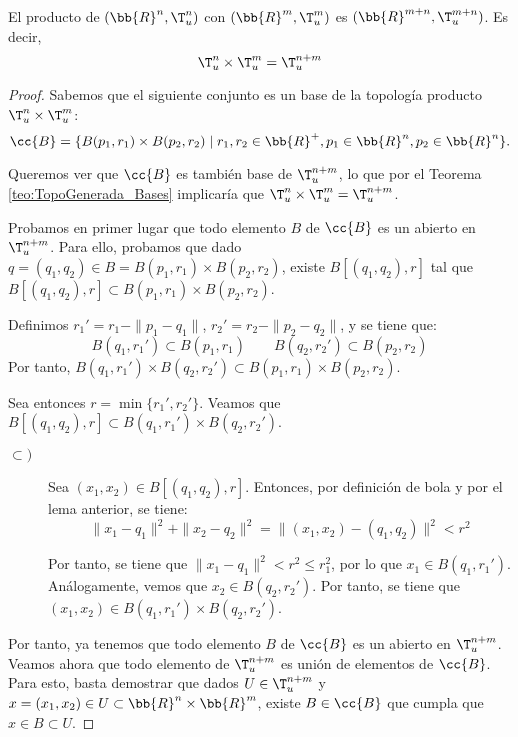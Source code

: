 \begin{prop}
    El producto de $(\bb{R}^n,\T_u^n)$ con $(\bb{R}^m,\T_u^m)$ es $(\bb{R}^{m+n},\T_u^{m+n})$. Es decir,
    \begin{equation*}
        \T_u^n\times \T_u^m = \T_u^{n+m}
    \end{equation*}
\end{prop}
\begin{proof}
    Sabemos que el siguiente conjunto es un base de la topología producto $\T_u^n\times \T_u^m$: $$\cc{B}=\{B(p_1, r_1)\times B(p_2,r_2)\mid r_1,r_2\in \bb{R}^+, p_1\in\bb{R}^n, p_2\in \bb{R}^n\}.$$

    Queremos ver que $\cc{B}$ es también base de $\T_u^{n+m}$, lo que por el Teorema \ref{teo:TopoGenerada_Bases} implicaría que $\T_u^n\times \T_u^m = \T_u^{n+m}$.


    Probamos en primer lugar que todo elemento $B$ de $\cc{B}$ es un abierto en $\T_u^{n+m}$. Para ello, probamos que dado $q=(q_1,q_2)\in B=B(p_1,r_1)\times B(p_2,r_2)$, existe $B[(q_1,q_2), r]$ tal que $B[(q_1,q_2), r]\subset B(p_1, r_1)\times B(p_2,r_2)$.

    Definimos $r_1'=r_1-\|p_1-q_1\|$, $r_2'=r_2-\|p_2-q_2\|$, y se tiene que:
    \begin{equation*}
        B(q_1,r_1')\subset B(p_1,r_1)
        \qquad 
        B(q_2,r_2')\subset B(p_2,r_2)
    \end{equation*}
    Por tanto, $B(q_1,r_1')\times B(q_2,r_2')\subset B(p_1, r_1)\times B(p_2,r_2)$.

    Sea entonces $r=\min\{r_1',r_2'\}$. Veamos que $B[(q_1,q_2), r]\subset B(q_1,r_1')\times B(q_2,r_2')$.
    \begin{description}
        \item[$\subset)$] Sea $(x_1,x_2)\in B[(q_1,q_2), r]$. Entonces, por definición de bola y por el lema anterior, se tiene:
        \begin{equation*}
            \|x_1-q_1\|^2 + \|x_2-q_2\|^2=\|(x_1,x_2)-(q_1,q_2)\|^2<r^2
        \end{equation*}

        Por tanto, se tiene que $\|x_1-q_1\|^2<r^2\leq r_1^2$, por lo que $x_1\in B(q_1,r_1')$. Análogamente, vemos que $x_2\in B(q_2, r_2')$. Por tanto, se tiene que $(x_1,x_2)\in B(q_1,r_1')\times B(q_2,r_2')$.
    \end{description}



    Por tanto, ya tenemos que todo elemento $B$ de $\cc{B}$ es un abierto en $\T_u^{n+m}$. Veamos ahora que todo elemento de $\T_u^{n+m}$ es unión de elementos de $\cc{B}$. Para esto, basta demostrar que dados $U\in \T_u^{n+m}$ y $x=(x_1,x_2)\in U\subset \bb{R}^n\times \bb{R}^m$, existe $B\in \cc{B}$ que cumpla que $x\in B\subset U$.


\end{proof}
